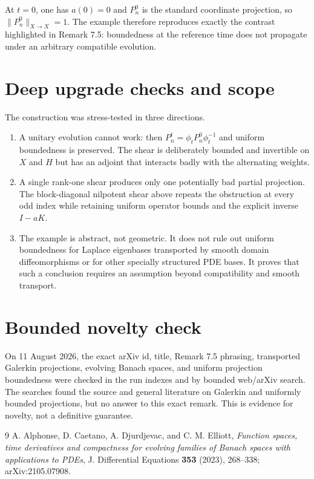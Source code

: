 \documentclass[11pt]{article}
\begin{document}
At $t=0$, one has $a(0)=0$ and $P_n^0$ is the standard coordinate projection, so $\|P_n^0\|_{X\to X}=1$.  The example therefore reproduces exactly the contrast highlighted in Remark 7.5: boundedness at the reference time does not propagate under an arbitrary compatible evolution.

\section*{Deep upgrade checks and scope}
The construction was stress-tested in three directions.
\begin{enumerate}[leftmargin=2em]
\item A unitary evolution cannot work: then $P_n^t=\phi_tP_n^0\phi_t^{-1}$ and uniform boundedness is preserved.  The shear is deliberately bounded and invertible on $X$ and $H$ but has an adjoint that interacts badly with the alternating weights.
\item A single rank-one shear produces only one potentially bad partial projection.  The block-diagonal nilpotent shear above repeats the obstruction at every odd index while retaining uniform operator bounds and the explicit inverse $I-aK$.
\item The example is abstract, not geometric.  It does not rule out uniform boundedness for Laplace eigenbases transported by smooth domain diffeomorphisms or for other specially structured PDE bases.  It proves that such a conclusion requires an assumption beyond compatibility and smooth transport.
\end{enumerate}

\section*{Bounded novelty check}
On 11 August 2026, the exact arXiv id, title, Remark 7.5 phrasing, transported Galerkin projections, evolving Banach spaces, and uniform projection boundedness were checked in the run indexes and by bounded web/arXiv search.  The searches found the source and general literature on Galerkin and uniformly bounded projections, but no answer to this exact remark.  This is evidence for novelty, not a definitive guarantee.

\begin{thebibliography}{9}
A. Alphonse, D. Caetano, A. Djurdjevac, and C. M. Elliott,
\emph{Function spaces, time derivatives and compactness for evolving families of Banach spaces with applications to PDEs},
J. Differential Equations \textbf{353} (2023), 268--338; arXiv:2105.07908.
\end{thebibliography}
\end{document}
